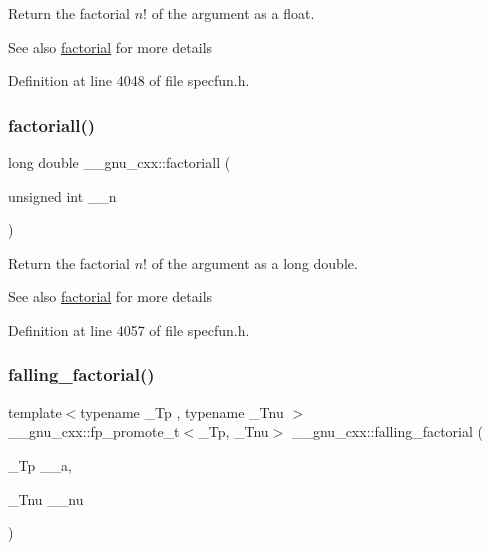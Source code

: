Return the factorial $ n! $ of the argument as a {\ttfamily float}.

\begin{DoxySeeAlso}{See also}
\hyperlink{group__gnu__math__spec__func_ga963b1612f50b0964f5f42c9f289aab68}{factorial} for more details 
\end{DoxySeeAlso}


Definition at line 4048 of file specfun.\+h.

\mbox{\label{group__gnu__math__spec__func_ga0904e504fdc3c8b9b6f5c66a73531584}} 
\subsubsection{\texorpdfstring{factoriall()}{factoriall()}}
{\footnotesize\ttfamily long double \+\_\+\+\_\+gnu\+\_\+cxx\+::factoriall (\begin{DoxyParamCaption}\item[{unsigned int}]{\+\_\+\+\_\+n }\end{DoxyParamCaption})\hspace{0.3cm}{\ttfamily [inline]}}

Return the factorial $ n! $ of the argument as a {\ttfamily long double}.

\begin{DoxySeeAlso}{See also}
\hyperlink{group__gnu__math__spec__func_ga963b1612f50b0964f5f42c9f289aab68}{factorial} for more details 
\end{DoxySeeAlso}


Definition at line 4057 of file specfun.\+h.

\mbox{\label{group__gnu__math__spec__func_ga3cc8eb6068c7155ec48b40e20160c5c0}} 
\subsubsection{\texorpdfstring{falling\+\_\+factorial()}{falling\_factorial()}}
{\footnotesize\ttfamily template$<$typename \+\_\+\+Tp , typename \+\_\+\+Tnu $>$ \\
\+\_\+\+\_\+gnu\+\_\+cxx\+::fp\+\_\+promote\+\_\+t$<$\+\_\+\+Tp, \+\_\+\+Tnu$>$ \+\_\+\+\_\+gnu\+\_\+cxx\+::falling\+\_\+factorial (\begin{DoxyParamCaption}\item[{\+\_\+\+Tp}]{\+\_\+\+\_\+a,  }\item[{\+\_\+\+Tnu}]{\+\_\+\+\_\+nu }\end{DoxyParamCaption})\hspace{0.3cm}{\ttfamily [inline]}}



